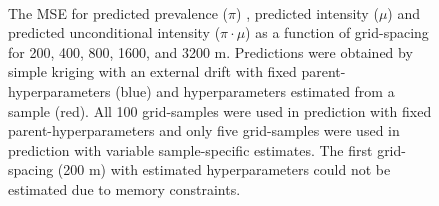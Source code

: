\documentclass[review]{elsarticle}
\begin{document}
\begin{figure}[htbp]
\quad
{}\quad
{}\\
\caption{The MSE for predicted prevalence ($\pi$) \protect{}, predicted intensity ($\mu$) \protect{} and predicted unconditional intensity ($\pi \cdot \mu$) \protect{} as a function of grid-spacing for 200, 400, 800, 1600, and 3200 m. Predictions were obtained by simple kriging with an external drift with fixed parent-hyperparameters (blue) and hyperparameters estimated from a sample (red). 
All 100 grid-samples were used in prediction with fixed parent-hyperparameters and only five grid-samples were used in prediction with variable sample-specific estimates.  The first grid-spacing (200 m) with estimated hyperparameters could not be estimated due to memory constraints.}
\label{fig:mse}
\end{figure}
\end{document}
